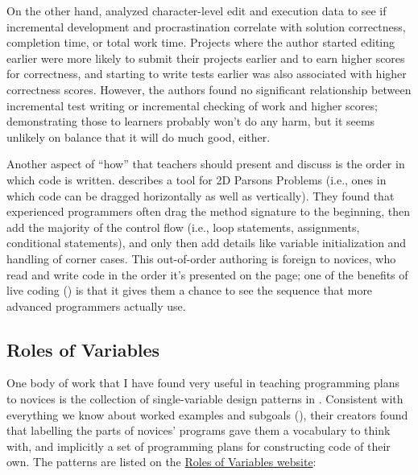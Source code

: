 On the other hand, \cite{Kaze2017} analyzed character-level edit and
execution data to see if incremental development and procrastination
correlate with solution correctness, completion time, or total work
time.  Projects where the author started editing earlier were more
likely to submit their projects earlier and to earn higher scores for
correctness, and starting to write tests earlier was also associated
with higher correctness scores.  However, the authors found no
significant relationship between incremental test writing or
incremental checking of work and higher scores; demonstrating those
to learners probably won't do any harm, but it seems unlikely on
balance that it will do much good, either.

Another aspect of ``how'' that teachers should present and discuss is
the order in which code is written.  \cite{Ihan2011} describes a tool
for 2D Parsons Problems (i.e., ones in which code can be dragged
horizontally as well as vertically).  They found that experienced
programmers often drag the method signature to the beginning, then add
the majority of the control flow (i.e., loop statements, assignments,
conditional statements), and only then add details like variable
initialization and handling of corner cases.  This out-of-order
authoring is foreign to novices, who read and write code in the order
it's presented on the page; one of the benefits of live coding
() is that it gives them a chance to see
the sequence that more advanced programmers actually use.

\subsection*{Roles of Variables}

One body of work that I have found very useful in teaching programming
plans to novices is the collection of single-variable design patterns
in \cite{Kuit2004,Byck2005,Saja2006}.  Consistent with everything we
know about worked examples and subgoals (), their
creators found that labelling the parts of novices' programs gave them
a vocabulary to think with, and implicitly a set of programming plans
for constructing code of their own.  The patterns are listed on the
\href{http://www.cs.joensuu.fi/~saja/var\_roles/}{Roles of Variables
  website}:

